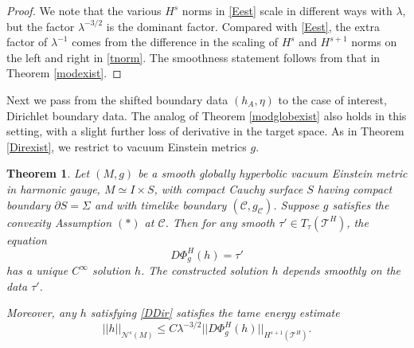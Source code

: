 \documentclass[10pt]{amsart}
\newcommand{\Si}{\Sigma}
\renewcommand{\l}{\lambda}
\newcommand{\cC}{{\mathcal C}}
\newcommand{\cT}{{\mathcal T}}
\newcommand{\cN}{{\mathcal N}}
\newcommand{\be}{\begin{equation}}
\newcommand{\ee}{\end{equation}}
\newcommand{\p}{\partial}
\newcommand{\<}{\langle}
\renewcommand{\>}{\rangle}
\theoremstyle{plain}
\newtheorem{theorem}[lemma]{Theorem}
\theoremstyle{remark}
\theoremstyle{definition}
\numberwithin{equation}{section}
\begin{document}
\begin{proof}
  We note that the various $H^s$ norms in \eqref{Eest} scale in different ways with $\l$, but the factor $\l^{-3/2}$ is the dominant factor. 
Compared with \eqref{Eest}, the extra factor of $\l^{-1}$ comes from the difference in the scaling of $H^s$ and $H^{s+1}$ norms on the left and right in 
\eqref{tnorm}.  The smoothness statement follows from that in Theorem \ref{modexist}. 

\end{proof} 

  Next we pass from the shifted boundary data $(h_A, \eta)$ to the case of interest, Dirichlet boundary data. The analog of Theorem \ref{modglobexist} 
 also holds in this setting, with a slight further loss of derivative in the target space. As in Theorem \ref{Direxist}, we restrict to vacuum Einstein metrics $g$. 
  
  \begin{theorem}\label{Dirglobexist} 
  Let $(M, g)$ be a smooth globally hyperbolic vacuum Einstein metric in harmonic gauge, $M \simeq I \times S$, with compact Cauchy surface $S$ having 
compact boundary $\p S = \Si$ and with timelike boundary $(\cC, g_{\cC})$. Suppose $g$ satisfies the convexity Assumption $(*)$ at $\cC$. Then for any 
smooth $\tau' \in T_{\tau}(\cT^H)$, the equation 
\be \label{DDir}
D \Phi_g^H(h) = \tau'
\ee
has a unique $C^{\infty}$ solution $h$. The constructed solution $h$ depends smoothly on the data $\tau'$. 

Moreover, any $h$ satisfying \eqref{DDir} satisfies the tame energy estimate 
\be \label{DirEest}
||h||_{\cN^s(M)}  \leq C\l^{-3/2} ||D\Phi_g^H(h)||_{H^{s+1}(\cT^H)}. 
\ee
  \end{theorem} 
\end{document}

